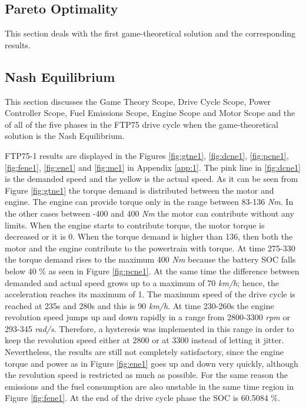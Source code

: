 \subsection{Pareto Optimality}
This section deals with the first game-theoretical solution and the corresponding results. 

\subsection{Nash Equilibrium}
This section discusses the Game Theory Scope, Drive Cycle Scope, Power Controller Scope, Fuel Emissions Scope, Engine Scope and Motor Scope and the of all of the five phases in the FTP75 drive cycle when the game-theoretical solution is the Nash Equilibrium.

FTP75-1 results are displayed in the Figures \ref{fig:gtne1}, \ref{fig:dcne1}, \ref{fig:pcne1}, \ref{fig:fene1}, \ref{fig:ene1} and \ref{fig:me1} in Appendix \ref{app:1}. The pink line in \ref{fig:dcne1} is the demanded speed and the yellow is the actual speed. As it can be seen from Figure \ref{fig:gtne1} the torque demand is distributed between the motor and engine. The engine can provide torque only in the range between 83-136 \textit{Nm}. In the other cases between -400 and 400 \textit{Nm} the motor can contribute without any limits. When the engine starts to contribute torque, the motor torque is decreased or it is 0. When the torque demand is higher than 136, then both the motor and the engine contribute to the powertrain with torque. At time 275-330 the torque demand rises to the maximum 400 \textit{Nm} because the battery SOC falls below 40 \% as seen in Figure \ref{fig:pcne1}. At the same time the difference between demanded and actual speed grows up to a maximum of 70 \textit{km/h}; hence, the acceleration reaches its maximum of 1. The maximum speed of the drive cycle is reached at 235s and 280s and this is 90 \textit{km/h}. At time 230-260s the engine revolution speed jumps up and down rapidly in a range from 2800-3300 \textit{rpm} or 293-345 \textit{rad/s}. Therefore, a hysteresis was implemented in this range in order to keep the revolution speed either at 2800 or at 3300 instead of letting it jitter. Nevertheless, the results are still not completely satisfactory, since the engine torque and power as in Figure \ref{fig:ene1} goes up and down very quickly, although the revolution speed is restricted as much as possible. For the same reason the emissions and the fuel consumption are also unstable in the same time region in Figure \ref{fig:fene1}. At the end of the drive cycle phase the SOC is 60.5084 \%.

